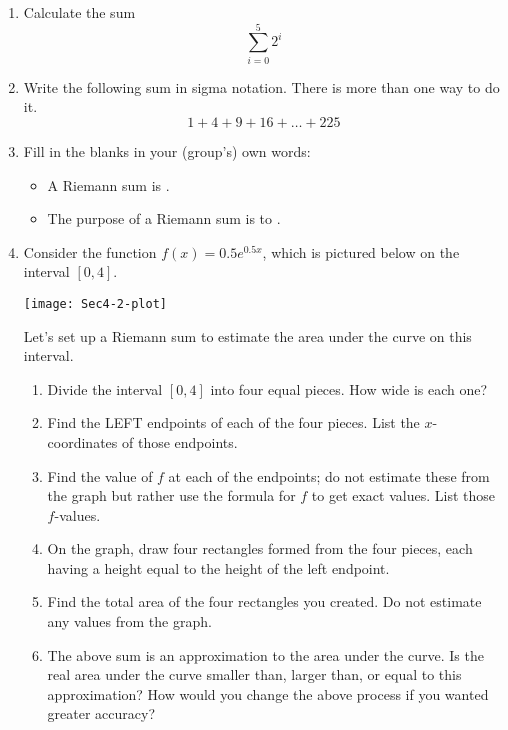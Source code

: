 \documentclass[11pt]{article}
\begin{document}
\begin{enumerate}
	\item Calculate the sum 
	\[ \sum_{i = 0}^{5} 2^i \]
	
	\item Write the following sum in sigma notation. There is more than one way to do it. 
	\[ 1 + 4 + 9 + 16 + \dots + 225 \]
	
	\item Fill in the blanks in your (group's) own words: 
	\begin{itemize}
		\item A Riemann sum is \underline{\hspace{2in}}. 
		\item The purpose of a Riemann sum is to \underline{\hspace{2in}}. 
	\end{itemize}
	
	\item Consider the function $f(x) = 0.5 e^{0.5x}$, which is pictured below on the interval $[0,4]$. 
\begin{center}
	\texttt{[image: Sec4-2-plot]}
\end{center}	
	
	
	Let's set up a Riemann sum to estimate the area under the curve on this interval. 
	\begin{enumerate}
		\item Divide the interval $[0,4]$ into four equal pieces. How wide is each one? 
		\item Find the LEFT endpoints of each of the four pieces. List the $x$-coordinates of those endpoints. 
		\item Find the value of $f$ at each of the endpoints; do not estimate these from the graph but rather use the formula for $f$ to get exact values. List those $f$-values. 
		\item On the graph, draw four rectangles formed from the four pieces, each having a height equal to the height of the left endpoint. 
		\item Find the total area of the four rectangles you created. Do not estimate any values from the graph. 
		\item The above sum is an approximation to the area under the curve. Is the real area under the curve smaller than, larger than, or equal to this approximation? How would you change the above process if you wanted greater accuracy? 
	\end{enumerate}
\end{enumerate}
\end{document}
